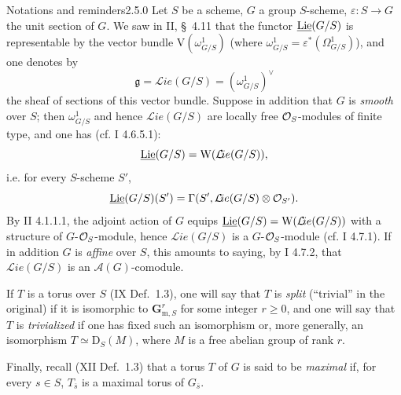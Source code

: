 \begin{enoncerm}{Notations and reminders}{2.5.0}\label{XIX.2.5.0}
{\renewcommand{\thefootnote}{(19)}}%
Let $S$ be a scheme, $G$ a group $S$-scheme, $\varepsilon:S\to G$ the unit section of $G$. We saw in II, \S~4.11 that the functor $\underline{\operatorname{Lie}}(G/S)$ is representable by the vector bundle $\mathrm V(\omega^1_{G/S})$ (where $\omega^1_{G/S}=\varepsilon^*(\Omega^1_{G/S})$), and one denotes by
\[
\mathfrak g=\mathcal{L}\!ie(G/S)=(\omega^1_{G/S})^\vee
\]
the sheaf of sections of this vector bundle. Suppose in addition that $G$ is \emph{smooth} over $S$; then $\omega^1_{G/S}$ and hence $\mathcal{L}\!ie(G/S)$ are locally free $\mathcal{O}_S$-modules of finite type, and one has (cf. I 4.6.5.1):
\[
\underline{\operatorname{Lie}}(G/S)=\mathrm W(\mathcal{L}\!ie(G/S)),
\]
i.e. for every $S$-scheme $S'$,
\[
\underline{\operatorname{Lie}}(G/S)(S')=\Gamma(S',\mathcal{L}\!ie(G/S)\otimes\mathcal{O}_{S'}).
\]
By II 4.1.1.1, the adjoint action of $G$ equips $\underline{\operatorname{Lie}}(G/S)=\mathrm W(\mathcal{L}\!ie(G/S))$ with a structure of $G$-$\mathcal{O}_S$-module, hence $\mathcal{L}\!ie(G/S)$ is a $G$-$\mathcal{O}_S$-module (cf. I 4.7.1). If in addition $G$ is \emph{affine} over $S$, this amounts to saying, by I 4.7.2, that $\mathcal{L}\!ie(G/S)$ is an $\mathcal A(G)$-comodule.

If $T$ is a torus over $S$ (IX Def.~1.3), one will say that $T$ is \emph{split} (``trivial'' in the original) if it is isomorphic to $\mathbf{G}_{\mathrm m,S}^r$ for some integer $r\geq0$, and one will say that $T$ is \emph{trivialized} if one has fixed such an isomorphism or, more generally, an isomorphism $T\simeq\mathrm D_S(M)$, where $M$ is a free abelian group of rank $r$.

Finally, recall (XII Def.~1.3) that a torus $T$ of $G$ is said to be \emph{maximal} if, for every $s\in S$, $T_{\overline{s}}$ is a maximal torus of $G_{\overline{s}}$.
\end{enoncerm}

